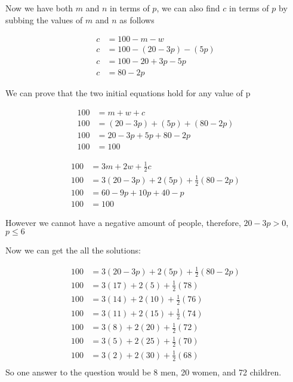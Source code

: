 \documentclass[12pt]{article} %
\begin{document}
\begin{homeworkProblem}
    Now we have both $m$ and $n$ in terms of $p$, we can also find $c$ in terms of $p$ by subbing the values of $m$ and $n$ as follows

    \begin{align*}
        c & = 100 - m - w            \\
        c & = 100 - (20 - 3p) - (5p) \\
        c & = 100 - 20 + 3p - 5p     \\
        c & = 80 - 2p
    \end{align*}

    We can prove that the two initial equations hold for any value of p

    \begin{align*}
        100 & = m + w + c                    \\
        100 & = (20 - 3p) + (5p) + (80 - 2p) \\
        100 & = 20 - 3p + 5p + 80 - 2p       \\
        100 & = 100
    \end{align*}

    \begin{align*}
        100 & = 3m + 2w + \frac{1}{2} c                    \\
        100 & = 3(20 - 3p) + 2(5p) + \frac{1}{2} (80 - 2p) \\
        100 & = 60 - 9p + 10p + 40 - p                     \\
        100 & = 100
    \end{align*}

    However we cannot have a negative amount of people, therefore, $20 - 3p > 0$, $p \leq 6$

    Now we can get the all the solutions:

    \begin{align*}
        100 & = 3(20 - 3p) + 2(5p) + \frac{1}{2} (80 - 2p) \\
        100 & = 3(17) + 2(5) + \frac{1}{2} (78)            \\
        100 & = 3(14) + 2(10) + \frac{1}{2} (76)           \\
        100 & = 3(11) + 2(15) + \frac{1}{2} (74)           \\
        100 & = 3(8) + 2(20) + \frac{1}{2} (72)            \\
        100 & = 3(5) + 2(25) + \frac{1}{2} (70)            \\
        100 & = 3(2) + 2(30) + \frac{1}{2} (68)            \\
    \end{align*}
    So one answer to the question would be 8 men, 20 women, and 72 children.
\end{homeworkProblem}
\end{document}
